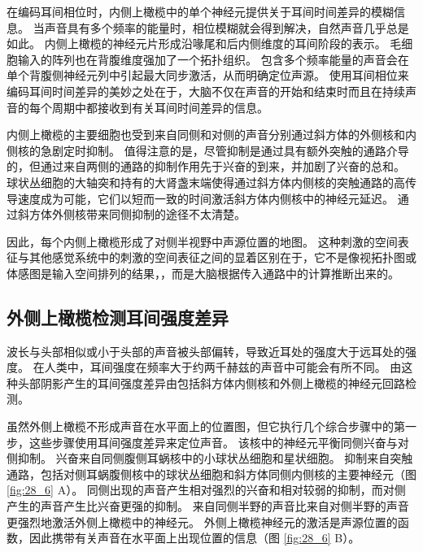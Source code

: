 在编码耳间相位时，内侧上橄榄中的单个神经元提供关于耳间时间差异的模糊信息。
当声音具有多个频率的能量时，相位模糊就会得到解决，自然声音几乎总是如此。
内侧上橄榄的神经元片形成沿喙尾和后内侧维度的耳间阶段的表示。
毛细胞输入的阵列也在背腹维度强加了一个拓扑组织。
包含多个频率能量的声音会在单个背腹侧神经元列中引起最大同步激活，从而明确定位声源。
使用耳间相位来编码耳间时间差异的美妙之处在于，大脑不仅在声音的开始和结束时而且在持续声音的每个周期中都接收到有关耳间时间差异的信息。


内侧上橄榄的主要细胞也受到来自同侧和对侧的声音分别通过斜方体的外侧核和内侧核的急剧定时抑制。
值得注意的是，尽管抑制是通过具有额外突触的通路介导的，但通过来自两侧的通路的抑制作用先于兴奋的到来，并加剧了兴奋的总和。
球状丛细胞的大轴突和持有的大肾盏末端使得通过斜方体内侧核的突触通路的高传导速度成为可能，它们以短而一致的时间激活斜方体内侧核中的神经元延迟。
通过斜方体外侧核带来同侧抑制的途径不太清楚。


因此，每个内侧上橄榄形成了对侧半视野中声源位置的地图。
这种刺激的空间表征与其他感觉系统中的刺激的空间表征之间的显着区别在于，它不是像视拓扑图或体感图是输入空间排列的结果，，而是大脑根据传入通路中的计算推断出来的。



\subsection{外侧上橄榄检测耳间强度差异}

波长与头部相似或小于头部的声音被头部偏转，导致近耳处的强度大于远耳处的强度。
在人类中，耳间强度在频率大于约两千赫兹的声音中可能会有所不同。
由这种头部阴影产生的耳间强度差异由包括斜方体内侧核和外侧上橄榄的神经元回路检测。


虽然外侧上橄榄不形成声音在水平面上的位置图，但它执行几个综合步骤中的第一步，这些步骤使用耳间强度差异来定位声音。
该核中的神经元平衡同侧兴奋与对侧抑制。
兴奋来自同侧腹侧耳蜗核中的小球状丛细胞和星状细胞。
抑制来自突触通路，包括对侧耳蜗腹侧核中的球状丛细胞和斜方体同侧内侧核的主要神经元（图 \ref{fig:28_6} A）。
同侧出现的声音产生相对强烈的兴奋和相对较弱的抑制，而对侧产生的声音产生比兴奋更强的抑制。
来自同侧半野的声音比来自对侧半野的声音更强烈地激活外侧上橄榄中的神经元。
外侧上橄榄神经元的激活是声源位置的函数，因此携带有关声音在水平面上出现位置的信息（图 \ref{fig:28_6} B）。


